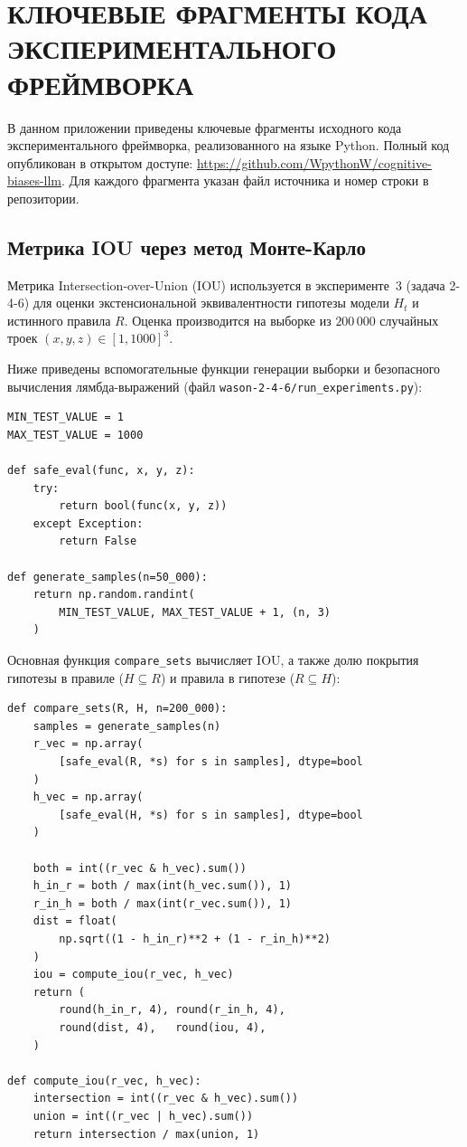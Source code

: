 \chapter{КЛЮЧЕВЫЕ ФРАГМЕНТЫ КОДА ЭКСПЕРИМЕНТАЛЬНОГО ФРЕЙМВОРКА}

В данном приложении приведены ключевые фрагменты исходного кода экспериментального фреймворка, реализованного на языке Python. Полный код опубликован в открытом доступе: \url{https://github.com/WpythonW/cognitive-biases-llm}. Для каждого фрагмента указан файл источника и номер строки в репозитории.

\section{Метрика IOU через метод Монте-Карло}
\label{sec:appC_iou}

Метрика Intersection-over-Union (IOU) используется в эксперименте~3 (задача 2-4-6) для оценки экстенсиональной эквивалентности гипотезы модели $H_t$ и истинного правила $R$. Оценка производится на выборке из $200\,000$ случайных троек $(x, y, z) \in [1, 1000]^3$.

Ниже приведены вспомогательные функции генерации выборки и безопасного вычисления лямбда-выражений (файл \texttt{wason-2-4-6/run\_experiments.py}):

\begin{lstlisting}
MIN_TEST_VALUE = 1
MAX_TEST_VALUE = 1000

def safe_eval(func, x, y, z):
    try:
        return bool(func(x, y, z))
    except Exception:
        return False

def generate_samples(n=50_000):
    return np.random.randint(
        MIN_TEST_VALUE, MAX_TEST_VALUE + 1, (n, 3)
    )
\end{lstlisting}

Основная функция \texttt{compare\_sets} вычисляет IOU, а также долю покрытия гипотезы в правиле ($H \subseteq R$) и правила в гипотезе ($R \subseteq H$):

\begin{lstlisting}
def compare_sets(R, H, n=200_000):
    samples = generate_samples(n)
    r_vec = np.array(
        [safe_eval(R, *s) for s in samples], dtype=bool
    )
    h_vec = np.array(
        [safe_eval(H, *s) for s in samples], dtype=bool
    )

    both = int((r_vec & h_vec).sum())
    h_in_r = both / max(int(h_vec.sum()), 1)
    r_in_h = both / max(int(r_vec.sum()), 1)
    dist = float(
        np.sqrt((1 - h_in_r)**2 + (1 - r_in_h)**2)
    )
    iou = compute_iou(r_vec, h_vec)
    return (
        round(h_in_r, 4), round(r_in_h, 4),
        round(dist, 4),   round(iou, 4),
    )

def compute_iou(r_vec, h_vec):
    intersection = int((r_vec & h_vec).sum())
    union = int((r_vec | h_vec).sum())
    return intersection / max(union, 1)
\end{lstlisting}


